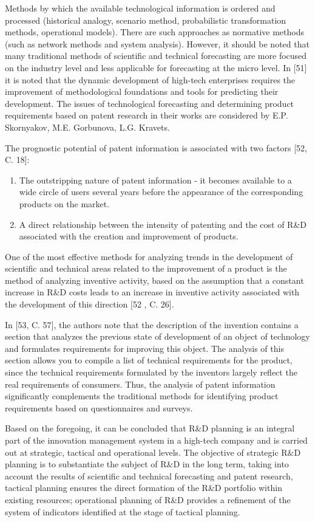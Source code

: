 \documentclass[12pt,twoside]{reedthesis}
\begin{document}
Methods by which the available technological information is ordered and processed (historical analogy, scenario method, probabilistic transformation methods, operational models). There are such approaches as normative methods (such as network methods and system analysis). However, it should be noted that many traditional methods of scientific and technical forecasting are more focused on the industry level and less applicable for forecasting at the micro level. In {[}51{]} it is noted that the dynamic development of high-tech enterprises requires the improvement of methodological foundations and tools for predicting their development. The issues of technological forecasting and determining product requirements based on patent research in their works are considered by E.P. Skornyakov, M.E. Gorbunova, L.G. Kravets.

The prognostic potential of patent information is associated with two factors {[}52, C. 18{]}:
\begin{enumerate}
\def\labelenumi{\arabic{enumi}.}
\item
  The outstripping nature of patent information - it becomes available to a wide circle of users several years before the appearance of the corresponding products on the market.
\item
  A direct relationship between the intensity of patenting and the cost of R\&D associated with the creation and improvement of products.
\end{enumerate}
One of the most effective methods for analyzing trends in the development of scientific and technical areas related to the improvement of a product is the method of analyzing inventive activity, based on the assumption that a constant increase in R\&D costs leads to an increase in inventive activity associated with the development of this direction {[}52 , C. 26{]}.

In {[}53, C. 57{]}, the authors note that the description of the invention contains a section that analyzes the previous state of development of an object of technology and formulates requirements for improving this object. The analysis of this section allows you to compile a list of technical requirements for the product, since the technical requirements formulated by the inventors largely reflect the real requirements of consumers. Thus, the analysis of patent information significantly complements the traditional methods for identifying product requirements based on questionnaires and surveys.

Based on the foregoing, it can be concluded that R\&D planning is an integral part of the innovation management system in a high-tech company and is carried out at strategic, tactical and operational levels. The objective of strategic R\&D planning is to substantiate the subject of R\&D in the long term, taking into account the results of scientific and technical forecasting and patent research, tactical planning ensures the direct formation of the R\&D portfolio within existing resources; operational planning of R\&D provides a refinement of the system of indicators identified at the stage of tactical planning.
\end{document}
